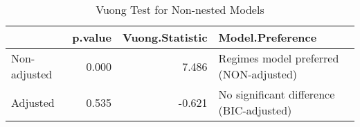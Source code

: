 \begin{table}

\caption{Vuong Test for Non-nested Models}
\centering
\begin{tabular}[t]{lrrl}
\toprule
  & p.value & Vuong.Statistic & Model.Preference\\
\midrule
Non-adjusted & 0.000 & 7.486 & Regimes model preferred (NON-adjusted)\\
Adjusted & 0.535 & -0.621 & No significant difference (BIC-adjusted)\\
\bottomrule
\end{tabular}
\end{table}
